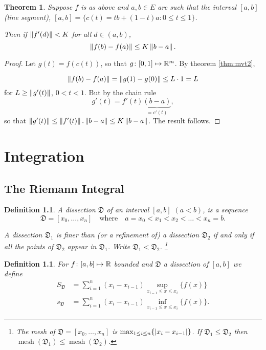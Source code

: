 \documentclass{notes}
\theoremstyle{plain}
\newtheorem{theorem}[proposition]{Theorem}
\newtheorem{definition}[proposition]{Definition}
\DeclareMathOperator{\mesh}{mesh}
\newcommand{\dis}{\mathfrak{D}}
\begin{document}
\begin{theorem}
Suppose $ f $ is as above and $ a,b \in E $ are such that the 
interval $ [a,b] $ (line segment), $ [a,b] = \{ c(t) = tb+(1-t)a: 
0 \leq t \leq 1 \} $.

Then if $ \left\|f'(d)\right\|<K $ for all $ d \in (a,b) $,
\[
\left\|f(b)-f(a)\right\| \leq K \left\|b-a\right\|.
\]
\end{theorem}

\begin{proof}
Let  $ g(t) = f(c(t)) $, so that $ g\colon [0,1] \mapsto \mathbb{R}^{m} $.
By theorem \ref{thm:mvt2},

\[
\left\|f(b)-f(a)\right\|=\left\|g(1)-g(0)\right\| \leq L\cdot 1 = L
\]
for $ L \geq \left\|g'(t)\right\|$, $0<t<1 $.
But by the chain rule
\[
g'(t)=f'(t) \underbrace{(b-a)}_{=c'(t)},
\]
so that $ \left\|g'(t)\right\| \leq \left\|f'(t)\right\|.\left\|b-a\right\| \leq K \left\|b-a\right\| $.
The result follows.
\end{proof}




\chapter{Integration}
\section{The Riemann Integral}

\begin{definition}
A \emph{dissection} $ \dis $ of an interval $ [a,b] $ $ (a<b) 
$, is a sequence 
\[
\dis = [x_{0}, \ldots, x_{n}] \quad \text{where} \quad
a=x_{0}<x_{1}<x_{2}<\ldots<x_{n}=b.
\]

A dissection $ \dis_{1} $ is \emph{finer} than (or a \emph{refinement} of) 
a dissection $ \dis_{2} $ if and only if all the points of $ 
\dis_{2} $ appear in $ \dis_{1} $. Write $ \dis_{1}<\dis_{2} $.
\footnote{The \emph{mesh} of $ \dis= [x_{0}, \ldots, x_{n}] $ is $ 
\max_{1 \leq i \leq n}\{\left|x_{i}-x_{i-1}\right|\} $.
If $ \dis_{1}\leq \dis_{2}  $ then $\mesh(\dis_{1}) \leq \mesh (\dis_{2}) $.}

\end{definition}


\begin{definition}
For $ f\colon  [a,b] \mapsto \mathbb{R} $ bounded and $ \dis $ a dissection 
of $ [a,b] $ we define
\begin{align*}
S_{\dis}& = \sum_{i=1}^{n}(x_{i}-x_{i-1}) \sup_{x_{i-1}\leq x \leq 
x_{i}}\{f(x)\} \\
s_{\dis}& = \sum_{i=1}^{n}(x_{i}-x_{i-1}) \inf_{x_{i-1}\leq x \leq 
x_{i}}\{f(x)\}.
\end{align*}
\end{definition}
\end{document}
